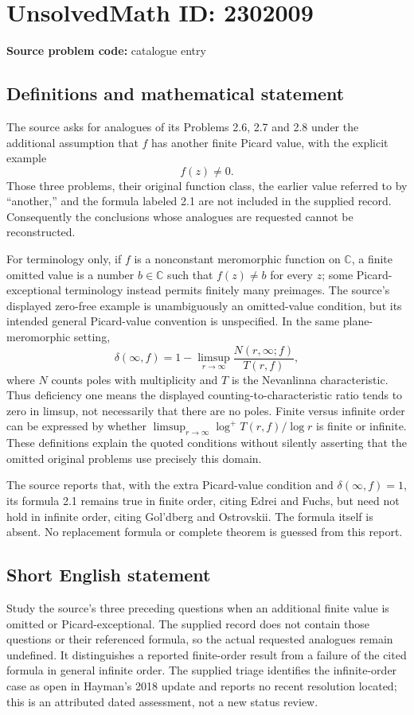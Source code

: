 \documentclass[11pt]{article}
\newcommand{\C}{\mathbb{C}}
\begin{document}
\section*{UnsolvedMath ID: 2302009}
\textbf{Source problem code:} catalogue entry
\subsection{Definitions and mathematical statement}
The source asks for analogues of its Problems 2.6, 2.7 and 2.8 under the additional assumption that $f$ has another finite Picard value, with the explicit example
\[
 f(z)\ne0.
\]
Those three problems, their original function class, the earlier value referred to by ``another,'' and the formula labeled 2.1 are not included in the supplied record. Consequently the conclusions whose analogues are requested cannot be reconstructed.

For terminology only, if $f$ is a nonconstant meromorphic function on $\C$, a finite omitted value is a number $b\in\C$ such that $f(z)\ne b$ for every $z$; some Picard-exceptional terminology instead permits finitely many preimages. The source's displayed zero-free example is unambiguously an omitted-value condition, but its intended general Picard-value convention is unspecified. In the same plane-meromorphic setting,
\[
 \delta(\infty,f)=1-\limsup_{r\to\infty}\frac{N(r,\infty;f)}{T(r,f)},
\]
where $N$ counts poles with multiplicity and $T$ is the Nevanlinna characteristic. Thus deficiency one means the displayed counting-to-characteristic ratio tends to zero in limsup, not necessarily that there are no poles. Finite versus infinite order can be expressed by whether $\limsup_{r\to\infty}\log^+T(r,f)/\log r$ is finite or infinite. These definitions explain the quoted conditions without silently asserting that the omitted original problems use precisely this domain.

The source reports that, with the extra Picard-value condition and $\delta(\infty,f)=1$, its formula 2.1 remains true in finite order, citing Edrei and Fuchs, but need not hold in infinite order, citing Gol'dberg and Ostrovskii. The formula itself is absent. No replacement formula or complete theorem is guessed from this report.
\subsection{Short English statement}
Study the source's three preceding questions when an additional finite value is omitted or Picard-exceptional. The supplied record does not contain those questions or their referenced formula, so the actual requested analogues remain undefined. It distinguishes a reported finite-order result from a failure of the cited formula in general infinite order. The supplied triage identifies the infinite-order case as open in Hayman's 2018 update and reports no recent resolution located; this is an attributed dated assessment, not a new status review.
\end{document}
